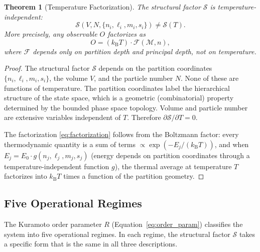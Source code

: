 \documentclass[twocolumn,10pt]{article}
\newtheorem{theorem}{Theorem}[section]
\theoremstyle{remark}
\newcommand{\kB}{k_{\mathrm{B}}}
\newcommand{\Depth}{\mathcal{M}}
\begin{document}
\begin{theorem}[Temperature Factorization]
\label{thm:temp_factorization}
The structural factor $\mathcal{S}$ is temperature-independent:
\begin{equation}
\mathcal{S}(V, N, \{n_i, \ell_i, m_i, s_i\}) \neq \mathcal{S}(T).
\label{eq:temp_factorization}
\end{equation}
More precisely, any observable $O$ factorizes as
\begin{equation}
O = (\kB T) \cdot \mathcal{F}(\Depth, n),
\label{eq:factorization}
\end{equation}
where $\mathcal{F}$ depends only on partition depth and principal depth, not on temperature.
\end{theorem}

\begin{proof}
The structural factor $\mathcal{S}$ depends on the partition coordinates $\{n_i, \ell_i, m_i, s_i\}$, the volume $V$, and the particle number $N$.
None of these are functions of temperature.
The partition coordinates label the hierarchical structure of the state space, which is a geometric (combinatorial) property determined by the bounded phase space topology.
Volume and particle number are extensive variables independent of $T$.
Therefore $\partial\mathcal{S}/\partial T = 0$.

The factorization \eqref{eq:factorization} follows from the Boltzmann factor: every thermodynamic quantity is a sum of terms $\propto \exp(-E_j/(\kB T))$, and when $E_j = E_0 \cdot g(n_j, \ell_j, m_j, s_j)$ (energy depends on partition coordinates through a temperature-independent function $g$), the thermal average at temperature $T$ factorizes into $\kB T$ times a function of the partition geometry.
\end{proof}

\subsection{Five Operational Regimes}

The Kuramoto order parameter $R$ (Equation~\ref{eq:order_param}) classifies the system into five operational regimes.
In each regime, the structural factor $\mathcal{S}$ takes a specific form that is the same in all three descriptions.
\end{document}

